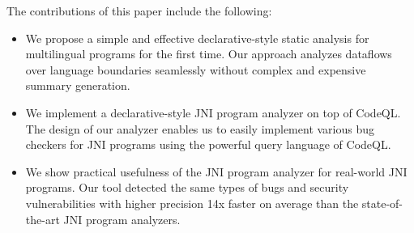 %
%
%

The contributions of this paper include the following:

\begin{itemize}
  \item We propose a simple and effective declarative-style static analysis for
    multilingual programs for the first time. Our approach analyzes dataflows
    over language boundaries seamlessly without complex and expensive summary
    generation.

\item We implement a declarative-style JNI program analyzer on top of CodeQL.
  The design of our analyzer enables us to easily implement various bug
    checkers for JNI programs using the powerful query language of CodeQL. 

\item We show practical usefulness of the JNI program analyzer for real-world
  JNI programs. Our tool detected the same types of bugs and security
    vulnerabilities with higher precision 14x faster on average than the
    state-of-the-art JNI program analyzers.
\end{itemize}
